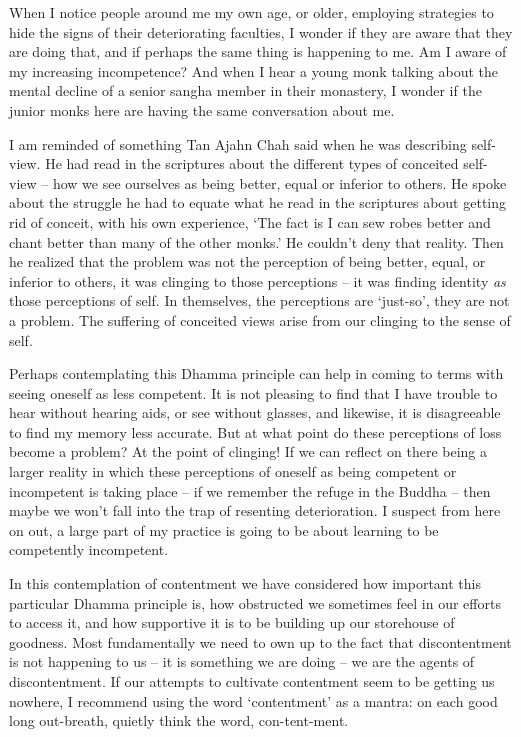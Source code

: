 When I notice people around me my own age, or older, employing
strategies to hide the signs of their deteriorating faculties, I wonder
if they are aware that they are doing that, and if perhaps the same
thing is happening to me. Am I aware of my increasing incompetence? And
when I hear a young monk talking about the mental decline of a senior
sangha member in their monastery, I wonder if the junior monks here are
having the same conversation about me.

I am reminded of something Tan Ajahn Chah said when he was describing
self-view. He had read in the scriptures about the different types of
conceited self-view -- how we see ourselves as being better, equal or
inferior to others. He spoke about the struggle he had to equate what he
read in the scriptures about getting rid of conceit, with his own
experience, `The fact is I can sew robes better and chant better than
many of the other monks.' He couldn't deny that reality. Then he
realized that the problem was not the perception of being better, equal,
or inferior to others, it was clinging to those perceptions -- it was
finding identity \emph{as} those perceptions of self. In themselves, the
perceptions are `just-so', they are not a problem. The suffering of
conceited views arise from our clinging to the sense of self.

Perhaps contemplating this Dhamma principle can help in coming to terms
with seeing oneself as less competent. It is not pleasing to find that I
have trouble to hear without hearing aids, or see without glasses, and
likewise, it is disagreeable to find my memory less accurate. But at
what point do these perceptions of loss become a problem? At the point
of clinging! If we can reflect on there being a larger reality in which these
perceptions of oneself as being competent or incompetent is taking place
-- if we remember the refuge in the Buddha -- then maybe we won't fall
into the trap of resenting deterioration. I suspect from here on out, a
large part of my practice is going to be about learning to be
competently incompetent.

\sectionBreak

In this contemplation of contentment we have considered how important
this particular Dhamma principle is, how obstructed we sometimes feel in
our efforts to access it, and how supportive it is to be building up our
storehouse of goodness. Most fundamentally we need to own up to the fact
that discontentment is not happening to us -- it is something we are
doing -- we are the agents of discontentment. If our attempts to
cultivate contentment seem to be getting us nowhere, I recommend using
the word `contentment' as a mantra: on each good long out-breath,
quietly think the word, con-tent-ment.

